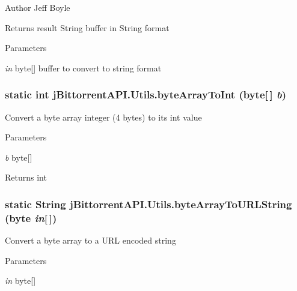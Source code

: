 \begin{DoxyAuthor}{Author}
Jeff Boyle
\end{DoxyAuthor}
\begin{DoxyReturn}{Returns}
result String buffer in String format
\end{DoxyReturn}

\begin{DoxyParams}{Parameters}
\item[{\em in}]byte\mbox{[}\mbox{]} buffer to convert to string format \end{DoxyParams}
\hypertarget{classj_bittorrent_a_p_i_1_1_utils_abc1701588e624f5f5be2906820ced349}{
\subsubsection[{byteArrayToInt}]{\setlength{\rightskip}{0pt plus 5cm}static int jBittorrentAPI.Utils.byteArrayToInt (byte\mbox{[}$\,$\mbox{]} {\em b})}}
\label{classj_bittorrent_a_p_i_1_1_utils_abc1701588e624f5f5be2906820ced349}
Convert a byte array integer (4 bytes) to its int value 
\begin{DoxyParams}{Parameters}
\item[{\em b}]byte\mbox{[}\mbox{]} \end{DoxyParams}
\begin{DoxyReturn}{Returns}
int 
\end{DoxyReturn}
\hypertarget{classj_bittorrent_a_p_i_1_1_utils_a23af68b4277c238ac14ca12808789f1a}{
\subsubsection[{byteArrayToURLString}]{\setlength{\rightskip}{0pt plus 5cm}static String jBittorrentAPI.Utils.byteArrayToURLString (byte {\em in}\mbox{[}$\,$\mbox{]})}}
\label{classj_bittorrent_a_p_i_1_1_utils_a23af68b4277c238ac14ca12808789f1a}
Convert a byte array to a URL encoded string 
\begin{DoxyParams}{Parameters}
\item[{\em in}]byte\mbox{[}\mbox{]} \end{DoxyParams}

